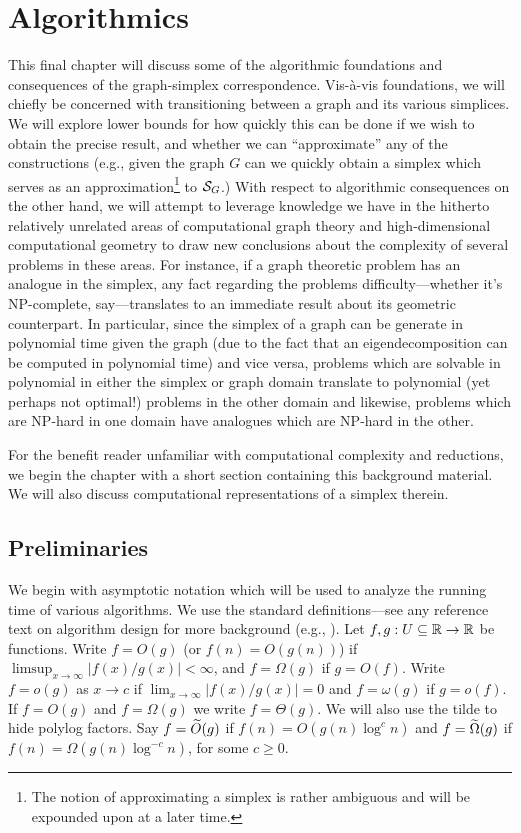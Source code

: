 \chapter{Algorithmics}

This final chapter will discuss some of the algorithmic foundations and consequences of the graph-simplex correspondence. Vis-\`{a}-vis foundations, we will chiefly be concerned with transitioning between a graph and its various simplices. We will explore lower bounds for how quickly this can be done if we wish to obtain the precise result, and whether we can ``approximate'' any of the constructions (e.g., given the graph $G$ can we quickly obtain a simplex which serves as an approximation\footnote{The notion of approximating a simplex is rather ambiguous and will be expounded upon at a later time.} to $\mathcal{S}_G$.) With respect to algorithmic consequences on the other hand, we will attempt to leverage knowledge we have in the hitherto relatively unrelated areas of computational graph theory and high-dimensional computational geometry to draw new conclusions about the complexity of several problems in these areas. For instance, if a  graph theoretic problem has an analogue in the simplex, any fact regarding the problems difficulty---whether it's NP-complete, say---translates to an immediate result about its geometric counterpart. In particular, since the simplex of a graph can be generate in polynomial time given the graph (due to the fact that an eigendecomposition can be computed in polynomial time) and vice versa, problems which are solvable in polynomial in either the simplex or graph domain  translate to polynomial (yet perhaps not optimal!) problems in the other domain and likewise, problems which are NP-hard in one domain have analogues which are NP-hard in the other. 

For the benefit reader unfamiliar with computational complexity and reductions, we begin the chapter with a short section containing this background material. We will also discuss computational representations of a simplex therein. 

\section{Preliminaries}

We begin with asymptotic notation which will be used to analyze the running time of various algorithms. We use the standard definitions---see any reference text on algorithm design for more background (e.g., \cite{kleinberg2006algorithm}). Let $f,g:U\subseteq \mathbb{R} \to \mathbb{R}$ be functions. Write $f=O(g)$ (or $f(n)=O(g(n))$) if $\limsup_{x\to \infty}|f(x)/g(x)|<\infty$, and $f=\Omega(g)$ if $g=O(f)$. Write $f=o(g)$ as $x\to c$ if $\lim_{x\to \infty}|f(x)/g(x)|=0$ and $f=\omega(g)$ if $g=o(f)$. If $f=O(g)$ and $f=\Omega(g)$ we write $f=\Theta(g)$. We will also use the tilde to hide polylog factors. Say $f=\widetilde{O}(g)$ if $f(n) = O(g(n) \log^c n)$ and $f=\widetilde{\Omega}(g)$ if $f(n) = \Omega(g(n) \log^{-c}n)$, for some $c\geq 0$. 


